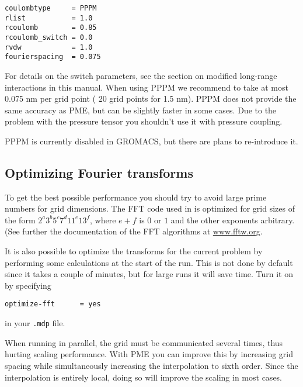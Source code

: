 \begin{verbatim}
coulombtype     = PPPM
rlist           = 1.0
rcoulomb        = 0.85
rcoulomb_switch = 0.0
rvdw            = 1.0
fourierspacing  = 0.075
\end{verbatim}

For details on the switch parameters, see the section on modified
long-range interactions in this manual. When using PPPM we recommend
to take at most 0.075 nm per grid point ({\eg} 20 grid points for 1.5
nm).  PPPM does not provide the same accuracy as PME, but can be
slightly faster in some cases. Due to the problem with the pressure
tensor you shouldn't use it with pressure coupling.

PPPM is currently disabled in GROMACS, but there are plans to
re-introduce it.


\subsection{Optimizing Fourier transforms}
To get the best possible performance you should try to avoid large
prime numbers for grid dimensions.
The FFT code used in {\gromacs} is
optimized for grid sizes of the form $2^a 3^b 5^c 7^d 11^e 13^f$,
where $e+f$ is $0$ or $1$ and the other exponents arbitrary. (See
further the documentation of the FFT algorithms at 
\href{http://www.fftw.org}{www.fftw.org}.

It is also possible to optimize the transforms for the current problem
by performing some calculations at the start of the run. This is not
done by default since it takes a couple of minutes, but for large
runs it will save time. Turn it on by specifying

\begin{verbatim}
optimize-fft      = yes
\end{verbatim}
in your {\tt .mdp} file.

When running in parallel, the grid must be communicated several times,
thus hurting scaling performance. With PME you can improve this
by increasing grid spacing while simultaneously increasing the
interpolation to {\eg} sixth order. 
Since the interpolation is entirely local, doing so will
improve the scaling in most cases.


